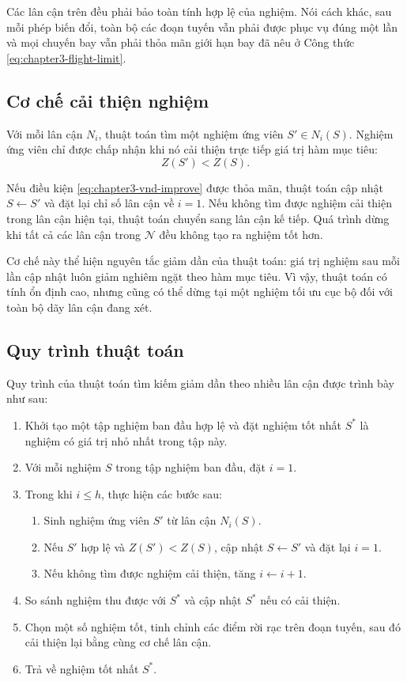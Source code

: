 Các lân cận trên đều phải bảo toàn tính hợp lệ của nghiệm. Nói cách khác, sau mỗi phép biến đổi, toàn bộ các đoạn tuyến vẫn phải được phục vụ đúng một lần và mọi chuyến bay vẫn phải thỏa mãn giới hạn bay đã nêu ở Công thức \eqref{eq:chapter3-flight-limit}.

\subsection{Cơ chế cải thiện nghiệm}

Với mỗi lân cận $N_i$, thuật toán tìm một nghiệm ứng viên $S' \in N_i(S)$. Nghiệm ứng viên chỉ được chấp nhận khi nó cải thiện trực tiếp giá trị hàm mục tiêu:
\begin{equation}
    Z(S') < Z(S).
    \label{eq:chapter3-vnd-improve}
\end{equation}

Nếu điều kiện \eqref{eq:chapter3-vnd-improve} được thỏa mãn, thuật toán cập nhật $S \leftarrow S'$ và đặt lại chỉ số lân cận về $i=1$. Nếu không tìm được nghiệm cải thiện trong lân cận hiện tại, thuật toán chuyển sang lân cận kế tiếp. Quá trình dừng khi tất cả các lân cận trong $\mathcal{N}$ đều không tạo ra nghiệm tốt hơn.

Cơ chế này thể hiện nguyên tắc giảm dần của thuật toán: giá trị nghiệm sau mỗi lần cập nhật luôn giảm nghiêm ngặt theo hàm mục tiêu. Vì vậy, thuật toán có tính ổn định cao, nhưng cũng có thể dừng tại một nghiệm tối ưu cục bộ đối với toàn bộ dãy lân cận đang xét.

\subsection{Quy trình thuật toán}

Quy trình của thuật toán tìm kiếm giảm dần theo nhiều lân cận được trình bày như sau:
\begin{enumerate}[leftmargin=1.2cm]
    \item Khởi tạo một tập nghiệm ban đầu hợp lệ và đặt nghiệm tốt nhất $S^*$ là nghiệm có giá trị nhỏ nhất trong tập này.
    \item Với mỗi nghiệm $S$ trong tập nghiệm ban đầu, đặt $i=1$.
    \item Trong khi $i \leq h$, thực hiện các bước sau:
    \begin{enumerate}[label=(\alph*), leftmargin=1.2cm]
        \item Sinh nghiệm ứng viên $S'$ từ lân cận $N_i(S)$.
        \item Nếu $S'$ hợp lệ và $Z(S')<Z(S)$, cập nhật $S \leftarrow S'$ và đặt lại $i=1$.
        \item Nếu không tìm được nghiệm cải thiện, tăng $i \leftarrow i+1$.
    \end{enumerate}
    \item So sánh nghiệm thu được với $S^*$ và cập nhật $S^*$ nếu có cải thiện.
    \item Chọn một số nghiệm tốt, tinh chỉnh các điểm rời rạc trên đoạn tuyến, sau đó cải thiện lại bằng cùng cơ chế lân cận.
    \item Trả về nghiệm tốt nhất $S^*$.
\end{enumerate}

